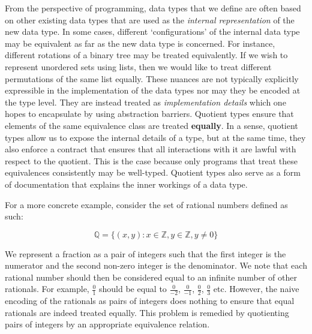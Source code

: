 \documentclass[12pt,twoside,maitrise]{dms}
\theoremstyle{definition}
\numberwithin{equation}{section}
\numberwithin{table}{chapter}
\numberwithin{figure}{chapter}
\begin{document}


From the perspective of programming, data types that we define are often based
on other existing data types that are used as the \emph{internal representation}
of the new data type. In some cases, different `configurations' of the internal
data type may be equivalent as far as the new data type is concerned. For
instance, different rotations of a binary tree may be treated equivalently. If
we wish to represent unordered sets using lists, then we would like to treat
different permutations of the same list equally. These nuances are not typically
explicitly expressible in the implementation of the data types nor may they be
encoded at the type level. They are instead treated as \emph{implementation
details} which one hopes to encapsulate by using abstraction barriers. Quotient
types ensure that elements of the same equivalence class are treated
\textbf{equally}. In a sense, quotient types allow us to expose the internal
details of a type, but at the same time, they also enforce a contract that
ensures that all interactions with it are lawful with respect to the quotient.
This is the case because only programs that treat these equivalences
consistently may be well-typed. Quotient types also serve as a form of
documentation that explains the inner workings of a data type.

For a more concrete example, consider the set of rational numbers defined as
such:

\begin{equation}
\mathbb{Q} = \{(x,y) : x \in \mathbb{Z}, y \in \mathbb{Z}, y \ne 0\}
\end{equation}

We represent a fraction as a pair of integers such that the first integer is the
numerator and the second non-zero integer is the denominator. We note that each
rational number should then be considered equal to an infinite number of other
rationals. For example, $\frac{0}{1}$ should be equal to $\frac{0}{-2}$,
$\frac{0}{-1}$, $\frac{0}{2}$, $\frac{0}{3}$ etc. However, the naive encoding of
the rationals as pairs of integers does nothing to ensure that equal rationals
are indeed treated equally. This problem is remedied by quotienting pairs of
integers by an appropriate equivalence relation.
\end{document}
